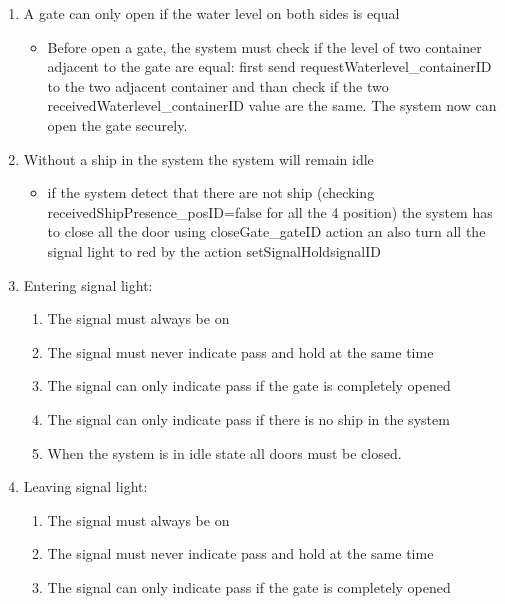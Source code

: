 \begin{enumerate}
\begin{itemize}
	\end{itemize}
	
	\item A gate can only open if the water level on both sides is equal
	\begin{itemize}
		\item Before open a gate, the system must check if the level of two container adjacent to the gate are equal: first send requestWaterlevel\_containerID to the two adjacent container and than check if the two receivedWaterlevel\_containerID value are the same. The system now can open the gate securely.
	\end{itemize}
	
	\item Without a ship in the system the system will remain idle
	\begin{itemize}
		\item if the system detect that there are not ship (checking receivedShipPresence\_posID=false for all the 4 position) the system has to close all the door using closeGate\_gateID action an also turn all the signal light to red by the action setSignalHold\-signalID
	\end{itemize}
	
	
	\item Entering signal light:
		\begin{enumerate}
			\item The signal must always be on
			\item The signal must never indicate pass and hold at the same time
			\item The signal can only indicate pass if the gate is completely opened
			\item The signal can only indicate pass if there is no ship in the system
			\item When the system is in idle state all doors must be closed.
			
		\end{enumerate}
	\item Leaving signal light:
		\begin{enumerate}
			\item The signal must always be on
			\item The signal must never indicate pass and hold at the same time
			\item The signal can only indicate pass if the gate is completely opened
		\end{enumerate}
\end{enumerate}
